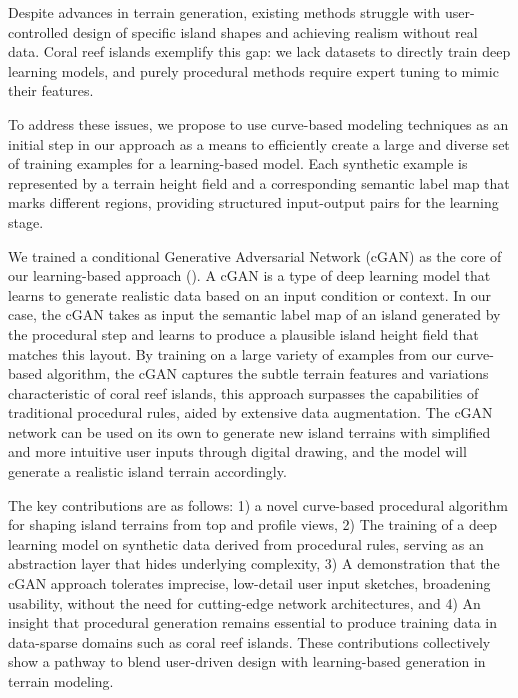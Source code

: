 Despite advances in terrain generation, existing methods struggle with user-controlled design of specific island shapes and achieving realism without real data. Coral reef islands exemplify this gap: we lack datasets to directly train deep learning models, and purely procedural methods require expert tuning to mimic their features.

To address these issues, we propose to use curve-based modeling techniques as an initial step in our approach as a means to efficiently create a large and diverse set of training examples for a learning-based model. Each synthetic example is represented by a terrain height field and a corresponding semantic label map that marks different regions, providing structured input-output pairs for the learning stage.

We trained a conditional Generative Adversarial Network (cGAN) as the core of our learning-based approach (\cite{Mirza2014,Isola2017}). A cGAN is a type of deep learning model that learns to generate realistic data based on an input condition or context. In our case, the cGAN takes as input the semantic label map of an island generated by the procedural step and learns to produce a plausible island height field that matches this layout. By training on a large variety of examples from our curve-based algorithm, the cGAN captures the subtle terrain features and variations characteristic of coral reef islands, this approach surpasses the capabilities of traditional procedural rules, aided by extensive data augmentation. The cGAN network can be used on its own to generate new island terrains with simplified and more intuitive user inputs through digital drawing, and the model will generate a realistic island terrain accordingly.

The key contributions are as follows: 1) a novel curve-based procedural algorithm for shaping island terrains from top and profile views, 2) The training of a deep learning model on synthetic data derived from procedural rules, serving as an abstraction layer that hides underlying complexity, 3) A demonstration that the cGAN approach tolerates imprecise, low-detail user input sketches, broadening usability, without the need for cutting-edge network architectures, and 4) An insight that procedural generation remains essential to produce training data in data-sparse domains such as coral reef islands. 
These contributions collectively show a pathway to blend user-driven design with learning-based generation in terrain modeling.
